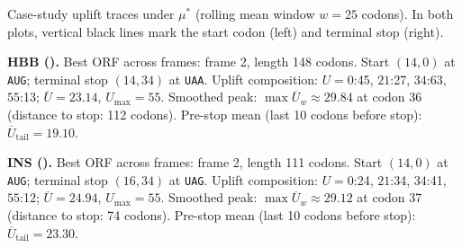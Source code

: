 Case-study uplift traces under $\mu^\ast$ (rolling mean window $w=25$ codons). In both plots, vertical black lines mark the start codon (left) and terminal stop (right).

\noindent\textbf{HBB ().} 
Best ORF across frames: frame 2, length 148 codons. Start $(14,0)$ at \texttt{AUG}; terminal stop $(14,34)$ at \texttt{UAA}. Uplift composition: $U=0$:45, $21$:27, $34$:63, $55$:13; $\overline{U}=23.14$, $U_{\mathrm{max}}=55$. Smoothed peak: $\max \overline{U}_w\approx 29.84$ at codon 36 (distance to stop: 112 codons). Pre-stop mean (last 10 codons before stop): $\overline{U}_{\mathrm{tail}}=19.10$.

\noindent\textbf{INS ().} 
Best ORF across frames: frame 2, length 111 codons. Start $(14,0)$ at \texttt{AUG}; terminal stop $(16,34)$ at \texttt{UAG}. Uplift composition: $U=0$:24, $21$:34, $34$:41, $55$:12; $\overline{U}=24.94$, $U_{\mathrm{max}}=55$. Smoothed peak: $\max \overline{U}_w\approx 29.12$ at codon 37 (distance to stop: 74 codons). Pre-stop mean (last 10 codons before stop): $\overline{U}_{\mathrm{tail}}=23.30$.
